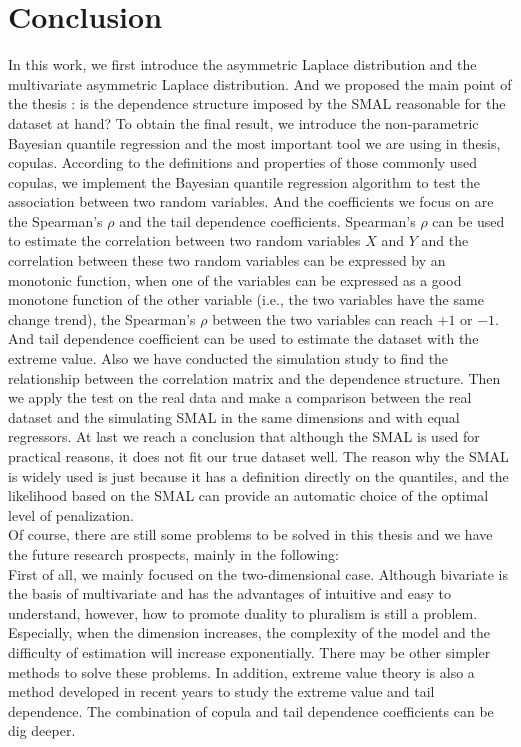 \documentclass[mstat,12pt]{unswthesis}  %
\numberwithin{equation}{section}
\begin{document}
\chapter{Conclusion}\label{ccl}
In this work, we first introduce the asymmetric Laplace distribution and the multivariate asymmetric Laplace distribution. And we proposed the main point of the thesis : is the dependence structure imposed by the SMAL reasonable for the dataset at hand? To obtain the final result, we introduce the non-parametric Bayesian quantile regression and the most important tool we are using in thesis, copulas. According to the definitions and properties of those commonly used copulas, we implement the Bayesian quantile regression algorithm to test the association between two random variables. And the coefficients we focus on are the Spearman's $\rho$ and the tail dependence coefficients. Spearman's $\rho$ can be used to estimate the correlation between two random variables $X$ and $Y$ and the correlation between these two random variables can be expressed by an monotonic function, when one of the variables can be expressed as a good monotone function of the other variable (i.e., the two variables have the same change trend), the Spearman's $\rho$ between the two variables can reach $+1$ or $-1$. And tail dependence coefficient can be used to estimate the dataset with the extreme value. Also we have conducted the simulation study to find the relationship between the correlation matrix and the dependence structure. Then we apply the test on the real data and make a comparison between the real dataset and the simulating SMAL in the same dimensions and with equal regressors. At last we reach a conclusion that although the SMAL is used for practical reasons, it does not fit our true dataset well. The reason why the SMAL is widely used is just because it has a definition directly on the quantiles, and the
likelihood based on the SMAL can provide an automatic choice of the optimal level of penalization.\\
Of course, there are still some problems to be solved in this thesis and we have the future research prospects, mainly in the following:\\
First of all, we mainly focused on the two-dimensional case. Although bivariate is the basis of multivariate and has the advantages of intuitive and easy to understand, however, how to promote duality to pluralism is still a problem. Especially, when the dimension increases, the complexity of the model and the difficulty of estimation will increase exponentially. There may be other simpler methods to solve these problems. In addition, extreme value theory is also a method developed in recent years to study the extreme value and tail dependence. The combination of copula and tail dependence coefficients can be dig deeper.
\end{document}
